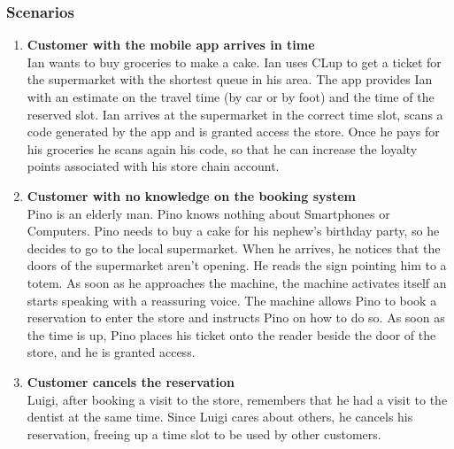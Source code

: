 \subsubsection{Scenarios}
    \begin{enumerate}[label=\Alph*.]
        \item \textbf{Customer with the mobile app arrives in time}\\
            Ian wants to buy groceries to make a cake. Ian uses CLup to get a ticket for the supermarket with the shortest queue in his area.
            The app provides Ian with an estimate on the travel time (by car or by foot) and the time of the reserved slot. 
            Ian arrives at the supermarket in the correct time slot, scans a code generated by the app and is granted access 
            the store. Once he pays for his groceries he scans again his code, so that he can increase the loyalty points associated with his store chain account.

        \item \textbf{Customer with no knowledge on the booking system}\\
            Pino is an elderly man. Pino knows nothing about Smartphones or Computers. Pino needs to buy a cake for his
            nephew's birthday party, so he decides to go to the local supermarket. When he arrives, he notices that the doors of the supermarket
            aren't opening. He reads the sign pointing him to a totem. 
            As soon as he approaches the machine, the machine activates itself an starts speaking with a reassuring voice. 
            The machine allows Pino to book a reservation to enter the store and instructs Pino on how to do so. 
            As soon as the time is up, Pino places his ticket onto the reader beside the door of the store, and he is granted access. 

        \item \textbf{Customer cancels the reservation}\\
            Luigi, after booking a visit to the store, remembers that he had a visit to the dentist at the same time.
            Since Luigi cares about others, he cancels his reservation, freeing up a time slot to be used by other customers.


\end{enumerate}
